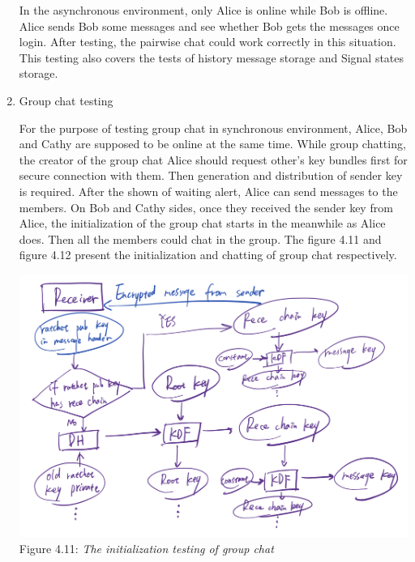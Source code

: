 \begin{enumerate}[label=(\roman*)]
In the asynchronous environment, only Alice is online while Bob is offline. Alice sends Bob some messages and see whether Bob gets the messages once login. After testing, the pairwise chat could work correctly in this situation. This testing also covers the tests of history message storage and Signal states storage.

\item Group chat testing

For the purpose of testing group chat in synchronous environment, Alice, Bob and Cathy are supposed to be online at the same time. While group chatting, the creator of the group chat Alice should request other's key bundles first for secure connection with them. Then generation and distribution of sender key is required. After the shown of waiting alert, Alice can send messages to the members. On Bob and Cathy sides, once they received the sender key from Alice, the initialization of the group chat starts in the meanwhile as Alice does. Then all the members could chat in the group. The figure 4.11 and figure 4.12 present the initialization and chatting of group chat respectively.

\begin{center}
\includegraphics[scale=.5]{../3-Background/resources/DH-rece.png}\\
Figure 4.11: \textit{The initialization testing of group chat}
\end{center}


\end{enumerate}
